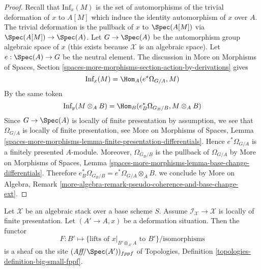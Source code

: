 \begin{proof}
Recall that $\text{Inf}_x(M)$ is the set of automorphisms of the
trivial deformation of $x$ to $A[M]$ which induce the identity
automorphism of $x$ over $A$. The trivial deformation is
the pullback of $x$ to $\Spec(A[M])$ via $\Spec(A[M]) \to \Spec(A)$.
Let $G \to \Spec(A)$ be the automorphism group algebraic space of $x$
(this exists because $\mathcal{X}$ is an algebraic space).
Let $e : \Spec(A) \to G$ be the neutral element.
The discussion in More on Morphisms of Spaces, Section
\ref{spaces-more-morphisms-section-action-by-derivations}
gives
$$
\text{Inf}_x(M) = \Hom_A(e^*\Omega_{G/A}, M)
$$
By the same token
$$
\text{Inf}_y(M \otimes_A B) = \Hom_B(e_B^*\Omega_{G_B/B}, M \otimes_A B)
$$
Since $G \to \Spec(A)$ is locally of finite presentation by
assumption, we see that $\Omega_{G/A}$ is locally of finite
presentation, see
More on Morphisms of Spaces, Lemma
\ref{spaces-more-morphisms-lemma-finite-presentation-differentials}.
Hence $e^*\Omega_{G/A}$ is a finitely presented $A$-module.
Moreover, $\Omega_{G_B/B}$ is the pullback of $\Omega_{G/A}$ by
More on Morphisms of Spaces, Lemma
\ref{spaces-more-morphisms-lemma-base-change-differentials}.
Therefore $e_B^*\Omega_{G_B/B} = e^*\Omega_{G/A} \otimes_A B$.
we conclude by More on Algebra, Remark
\ref{more-algebra-remark-pseudo-coherence-and-base-change-ext}.
\end{proof}

\begin{lemma}
\label{lemma-sheaf-of-infinitesimal-lifts}
Let $\mathcal{X}$ be an algebraic stack over a base scheme $S$.
Assume $\mathcal{I}_\mathcal{X} \to \mathcal{X}$ is locally
of finite presentation. Let $(A' \to A, x)$ be a deformation situation.
Then the functor
$$
F : B' \longmapsto
\{\text{lifts of }x|_{B' \otimes_{A'} A}\text{ to } B'\}/\text{isomorphisms}
$$
is a sheaf on the site $(\textit{Aff}/\Spec(A'))_{fppf}$ of
Topologies, Definition \ref{topologies-definition-big-small-fppf}.
\end{lemma}


